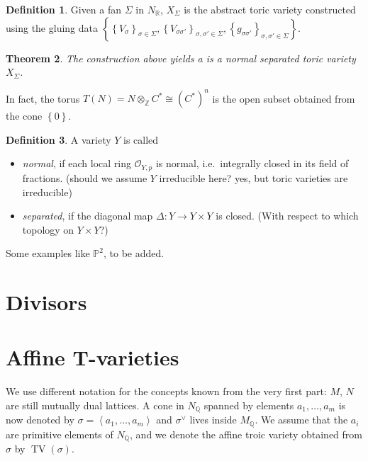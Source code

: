 \documentclass[a4paper]{article}
\DeclareMathOperator{\TV}{TV}
\newtheorem{theorem}{Theorem}[section]
\theoremstyle{definition}
\newtheorem{definition}[theorem]{Definition}
\begin{document}
  \begin{definition}
    Given  a fan $\Sigma$ in $N_{\mathbb{R}}$, $X_{\Sigma}$ is the abstract toric variety constructed using the gluing data $\left\{ \left\{V_{\sigma}\right\}_{\sigma \in \Sigma}, \left\{V_{\sigma \sigma'}\right\}_{\sigma, \sigma' \in \Sigma}, \left\{g_{\sigma \sigma'}\right\}_{\sigma, \sigma' \in \Sigma}\right\}$.
  \end{definition}
  \begin{theorem}
    The construction above yields a is a normal separated toric variety $X_{\Sigma}$.
  \end{theorem}
  In fact, the torus $T \left( N \right) = N \otimes_{\mathbb{Z}} C^{*} \cong \left( C^{*} \right)^{n}$ is the open subset obtained from the cone $\left\{ 0\right\}$.
  \begin{definition}
    A variety $Y$ is called
    \begin{itemize}
      \item \emph{normal}, if each local ring $\mathcal{O} _{Y,p}$ is normal, i.e.~integrally closed in its field of fractions. (should we assume $Y$ irreducible here? yes, but toric varieties are irreducible)
      \item \emph{separated}, if the diagonal map $\Delta \colon Y \rightarrow  Y \times Y$ is closed. (With respect to which topology on $Y \times Y$?)
    \end{itemize}
  \end{definition}

  Some examples like $\mathbb{P}^{2}$, to be added.\\

  
  
  \pagebreak
  \section{Divisors}

  \section{Affine T-varieties}
  We use different notation for the concepts known from the very first part: $M$, $ N$ are still mutually dual lattices. A cone in $N_{\mathbb{Q}}$ spanned by elements $a_{1}, \dots, a_{m}$ is now denoted by $\sigma = \left\langle a_{1}, \dots, a_{m} \right\rangle$ and $\sigma ^{\vee}  $ lives inside $M_{\mathbb{Q}}$. We assume that the $a_{i}$ are primitive elements of $N_{\mathbb{Q}}$, and we denote the affine troic variety obtained from $\sigma$ by $\TV \left( \sigma \right)$.
\end{document}
